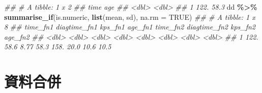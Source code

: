 \documentclass[
]{book}
\newenvironment{Shaded}{\begin{snugshade}}{\end{snugshade}}
\newcommand{\CommentTok}[1]{\textcolor[rgb]{0.56,0.35,0.01}{\textit{#1}}}
\newcommand{\DataTypeTok}[1]{\textcolor[rgb]{0.13,0.29,0.53}{#1}}
\newcommand{\KeywordTok}[1]{\textcolor[rgb]{0.13,0.29,0.53}{\textbf{#1}}}
\newcommand{\NormalTok}[1]{#1}
\newcommand{\OperatorTok}[1]{\textcolor[rgb]{0.81,0.36,0.00}{\textbf{#1}}}
\newcommand{\OtherTok}[1]{\textcolor[rgb]{0.56,0.35,0.01}{#1}}
\newcommand{\StringTok}[1]{\textcolor[rgb]{0.31,0.60,0.02}{#1}}
\begin{document}
\begin{Shaded}
\begin{Highlighting}[]
\CommentTok{\#\# \# A tibble: 1 x 2}
\CommentTok{\#\#    time   age}
\CommentTok{\#\#   \textless{}dbl\textgreater{} \textless{}dbl\textgreater{}}
\CommentTok{\#\# 1  122.  58.3}
\NormalTok{dd }\OperatorTok{\%\textgreater{}\%}\StringTok{ }
\StringTok{  }\KeywordTok{summarise\_if}\NormalTok{(is.numeric, }\KeywordTok{list}\NormalTok{(mean, sd), }\DataTypeTok{na.rm =} \OtherTok{TRUE}\NormalTok{)}
\CommentTok{\#\# \# A tibble: 1 x 8}
\CommentTok{\#\#   time\_fn1 diagtime\_fn1 kps\_fn1 age\_fn1 time\_fn2 diagtime\_fn2 kps\_fn2 age\_fn2}
\CommentTok{\#\#      \textless{}dbl\textgreater{}        \textless{}dbl\textgreater{}   \textless{}dbl\textgreater{}   \textless{}dbl\textgreater{}    \textless{}dbl\textgreater{}        \textless{}dbl\textgreater{}   \textless{}dbl\textgreater{}   \textless{}dbl\textgreater{}}
\CommentTok{\#\# 1     122.         58.6    8.77    58.3     158.         20.0    10.6    10.5}
\end{Highlighting}
\end{Shaded}

\hypertarget{ux8cc7ux6599ux5408ux4f75}{%
\section{資料合併}\label{ux8cc7ux6599ux5408ux4f75}}

  
\end{document}
